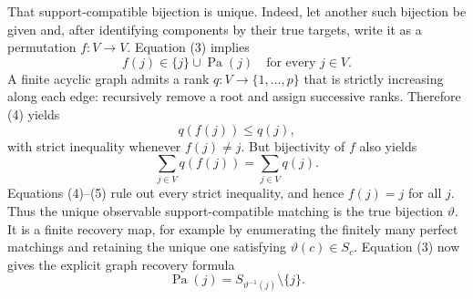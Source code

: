 That support-compatible bijection is unique.  Indeed, let another such
bijection be given and, after identifying components by their true targets,
write it as a permutation \(f:V\to V\).  Equation (3) implies
\[
 f(j)\in\{j\}\cup\operatorname{Pa}(j)
 \quad\text{for every }j\in V.                          \tag{4}
\]
A finite acyclic graph admits a rank \(q:V\to\{1,\ldots,p\}\) that is
strictly increasing along each edge: recursively remove a root and assign
successive ranks.  Therefore (4) yields
\[
 q(f(j))\leq q(j),
\]
with strict inequality whenever \(f(j)\neq j\).  But bijectivity of \(f\)
also yields
\[
 \sum_{j\in V}q(f(j))=\sum_{j\in V}q(j).                \tag{5}
\]
Equations (4)--(5) rule out every strict inequality, and hence
\(f(j)=j\) for all \(j\).  Thus the unique observable support-compatible
matching is the true bijection \(\vartheta\).  It is a finite recovery map,
for example by enumerating the finitely many perfect matchings and retaining
the unique one satisfying \(\vartheta(c)\in S_c\).  Equation (3) now gives
the explicit graph recovery formula
\[
 \operatorname{Pa}(j)
 =S_{\vartheta^{-1}(j)}\setminus\{j\}.                  \tag{6}
\]

